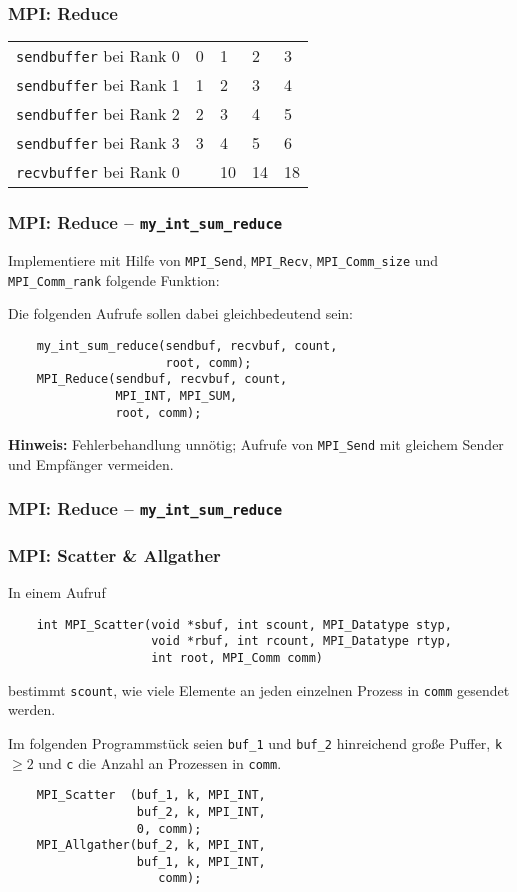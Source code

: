 \documentclass{beamer}
\begin{document}
\begin{frame}
  \frametitle{MPI: Reduce}
  \begin{table}
    \begin{tabular}{r|l l l l}
      \lstinline{sendbuffer} bei Rank 0 &       0 & 1 & 2 & 3 \\
      \lstinline{sendbuffer} bei Rank 1 &       1 & 2 & 3 & 4\\
      \lstinline{sendbuffer} bei Rank 2 &       2 & 3 & 4 & 5 \\
      \lstinline{sendbuffer} bei Rank 3 &       3 & 4 & 5 & 6 \\
      \lstinline{recvbuffer} bei Rank 0 &\pause 6 & 10 & 14 & 18 \\
    \end{tabular}
  \end{table}
\end{frame}

\begin{frame}[fragile]
  \frametitle{MPI: Reduce – \lstinline{my_int_sum_reduce}}
  Implementiere mit Hilfe von \lstinline{MPI_Send}, \lstinline{MPI_Recv}, \lstinline{MPI_Comm_size} und \lstinline{MPI_Comm_rank} folgende Funktion:
  
  Die folgenden Aufrufe sollen dabei gleichbedeutend sein:
  \begin{lstlisting}
    my_int_sum_reduce(sendbuf, recvbuf, count,
                      root, comm);
    MPI_Reduce(sendbuf, recvbuf, count,
               MPI_INT, MPI_SUM,
               root, comm);
  \end{lstlisting}
  
  \textbf{Hinweis:} Fehlerbehandlung unnötig; Aufrufe von \lstinline{MPI_Send} mit gleichem Sender und Empfänger vermeiden.
\end{frame}

\begin{frame}
  \frametitle{MPI: Reduce – \lstinline{my_int_sum_reduce}}
  
\end{frame}

\begin{frame}[fragile]
  \frametitle{MPI: Scatter \& Allgather}
  In einem Aufruf
  \begin{lstlisting}
    int MPI_Scatter(void *sbuf, int scount, MPI_Datatype styp,
                    void *rbuf, int rcount, MPI_Datatype rtyp,
                    int root, MPI_Comm comm)
  \end{lstlisting}
  bestimmt \lstinline{scount}, wie viele Elemente an jeden einzelnen Prozess in \lstinline{comm} gesendet werden.
  
  Im folgenden Programmstück seien \lstinline{buf_1} und \lstinline{buf_2} hinreichend große Puffer, \lstinline{k} $≥2$ und \lstinline{c} die Anzahl an Prozessen in \lstinline{comm}.
  \begin{lstlisting}
    MPI_Scatter  (buf_1, k, MPI_INT,
                  buf_2, k, MPI_INT,
                  0, comm);
    MPI_Allgather(buf_2, k, MPI_INT,
                  buf_1, k, MPI_INT,
                     comm);
    \end{lstlisting}
\end{frame}
\end{document}
